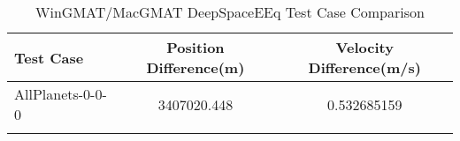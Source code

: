 \begin{table}[htbp!]
\centering
\caption{ WinGMAT/MacGMAT DeepSpaceEEq Test Case Comparison}
      \begin{tabular}{lcc}
      \hline\hline
          Test Case & Position Difference(m) & Velocity Difference(m/s) \\
         \hline
         AllPlanets-0-0-0 & 3407020.448 & 0.532685159 \\
      \hline\hline
      \label{Table: DeepSpaceEEq WinGMAT-MacGMAT Table} 
\end{tabular}
\end{table}
